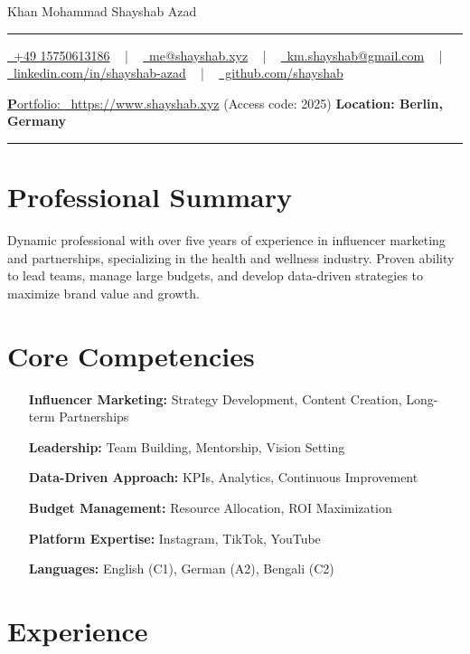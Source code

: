 \documentclass[letterpaper,10pt]{article}
\newcommand{\documentTitle}[2]{
  \begin{center}
    {\Huge\color{accentTitle} #1}
    \vspace{10pt}
    {\color{accentLine} \hrule}
    \vspace{2pt}
    \footnotesize{#2}
    \vspace{2pt}
    {\color{accentLine} \hrule}
  \end{center}
}
\begin{document}
  \documentTitle{Khan Mohammad Shayshab Azad}{
    \href{tel:+49 15750613186}{
      \raisebox{-0.05\height} \faPhone\ +49 15750613186} ~ | ~
      \href{mailto:km.shayshab@gmail.com}{
      \raisebox{-0.15\height} \faEnvelope\ me@shayshab.xyz} ~ | ~
    \href{mailto:me@shayshab.xyz}{
      \raisebox{-0.15\height} \faEnvelope\ km.shayshab@gmail.com} ~ | ~
    \href{https://linkedin.com/in/shayshab-azad/}{
      \raisebox{-0.15\height} \faLinkedin\ linkedin.com/in/shayshab-azad} ~ | ~
    \href { https://github.com/shayshab}{
      \raisebox{-0.15\height} \faGithub \ github.com/shayshab} 
     
      \href{https://www.shayshab.xyz/}{
      \raisebox{-0.15\height} {\textbf Portfolio: }\ https://www.shayshab.xyz}{ (Access code: 2025)}
    \textbf{ Location: Berlin, Germany}
  }

\section*{Professional Summary}
Dynamic professional with over five years of experience in influencer marketing and partnerships, specializing in the health and wellness industry. Proven ability to lead teams, manage large budgets, and develop data-driven strategies to maximize brand value and growth.

\section{Core Competencies}
  \begin{itemize}[itemsep=-2px, parsep=1pt, leftmargin=120 pt]
    \item[\textbf{Influencer Marketing:}] Strategy Development, Content Creation, Long-term Partnerships
    \item[\textbf{Leadership:}] Team Building, Mentorship, Vision Setting
    \item[\textbf{Data-Driven Approach:}] KPIs, Analytics, Continuous Improvement
    \item[\textbf{Budget Management:}] Resource Allocation, ROI Maximization
    \item[\textbf{Platform Expertise:}] Instagram, TikTok, YouTube
    \item[\textbf{Languages:}] English (C1), German (A2), Bengali (C2)
  \end{itemize}

\section{Experience}
\end{document}
